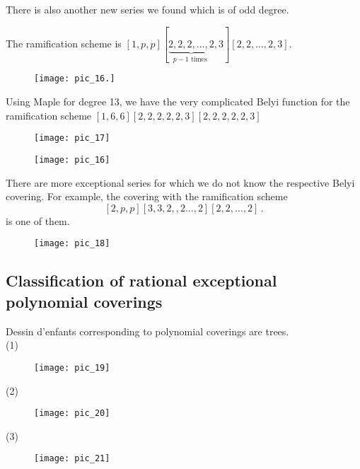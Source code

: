 \begin{example}
    There is also another new series we found which is of odd degree.

The ramification scheme is $[1, p, p][\underbrace{2,2,2, \ldots, 2}_{p-1 \text { times }}, 3][2,2, \ldots, 2,3]$.

\begin{figure}[htp]
\texttt{[image: pic\_16.]}
\end{figure}  

Using Maple for degree 13, we have the very complicated Belyi function for the ramification scheme
$[1,6,6][2,2,2,2,2,3][2,2,2,2,2,3]$ 
\begin{figure}[htp]
\texttt{[image: pic\_17]}
\end{figure}  

\begin{figure}[htp]
\texttt{[image: pic\_16]}
\end{figure}  

\end{example}
\newpage
\begin{example}
    There are more exceptional series for which we do not know the respective Belyi covering. For example, the covering with the ramification scheme 
    $$[2, p, p][3,3,2,, 2 \ldots, 2][2,2, \ldots, 2]\,.$$ is one of them.
\begin{figure}[htp]
\texttt{[image: pic\_18]}
\end{figure}    
\end{example}
\subsection{Classification of rational exceptional polynomial coverings}

Dessin d'enfants corresponding to polynomial coverings are trees. \\

(1)
\begin{figure}[!htb]
\texttt{[image: pic\_19]}
\end{figure} 


(2)\\
\begin{figure}[!htb]
\texttt{[image: pic\_20]}
\end{figure} 

(3)\\
\begin{figure}[!htb]
\texttt{[image: pic\_21]}
\end{figure}

